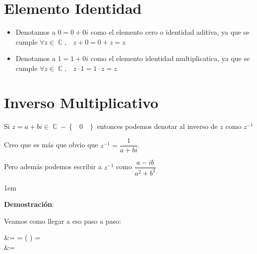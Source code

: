 \documentclass[12pt, fleqn]{report}                             %
\newenvironment{SmallIndentation}[1][0.75em]                    %
    {\begin{adjustwidth}{#1}{}\begin{footnotesize}}                 %
    {\end{footnotesize}\end{adjustwidth}}                           %
\DeclareMathOperator \Space {\quad}                             %
\DeclareMathOperator \MiniSpace {\;}                            %
\newcommand{\Set}[1]{\left\{ \MiniSpace #1 \MiniSpace \right\}} %
\newcommand{\Wrap}[1]{\left( #1 \right)}                        %
\newcommand{\pfrac}[2]{\Wrap{\dfrac{#1}{#2}}}                   %
\newenvironment{MultiLineEquation*}[1]                          %
        {\begin{equation*}\begin{alignedat}{#1}}                    %
        {\end{alignedat}\end{equation*}}                            %
\DeclareMathOperator \Complexs  {\mathbb{C}}                     %
\begin{document}
        \clearpage
        \section{Elemento Identidad}

            \begin{itemize}
                \item Denotamos a $0 = 0 + 0i$ como el elemento cero o identidad aditiva, ya que se cumple 
                        $\forall z \in \Complexs, \MiniSpace z + 0 = 0 + z = z$

                \item Denotamos a $1 = 1 + 0i$ como el elemento identidad multiplicatica, ya que se cumple 
                        $\forall z \in \Complexs, \MiniSpace z \cdot 1 = 1 \cdot z = z$
            \end{itemize}



        \section{Inverso Multiplicativo}
            
            Si $z = a + bi \in \Complexs - \Set{0}$ entonces podemos denotar al inverso de $z$ como
            $z^{-1}$

            Creo que es más que obvio que $z^{-1} = \dfrac{1}{a+bi}$.

            Pero además podemos escribir a $z^{-1}$ como $\dfrac{a-ib}{a^2+b^2}$

            \begin{SmallIndentation}[1em]
                \textbf{Demostración}:
                
                Veamos como llegar a eso paso a paso:
                \begin{MultiLineEquation*}{1}
                     &=                          
                                  = \pfrac{a-bi}{a-bi}
                                  =               \\
                                 &=                  
                \end{MultiLineEquation*}

            \end{SmallIndentation}
\end{document}
